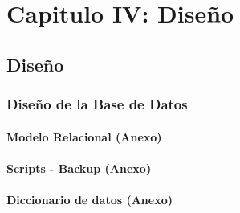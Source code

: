 \chapter{\textbf{Capitulo IV: Diseño}}

\section{Diseño}

\subsection{Diseño de la Base de Datos}

\subsubsection{Modelo Relacional (Anexo)}
\subsubsection{Scripts - Backup (Anexo)}
\subsubsection{Diccionario de datos (Anexo)}